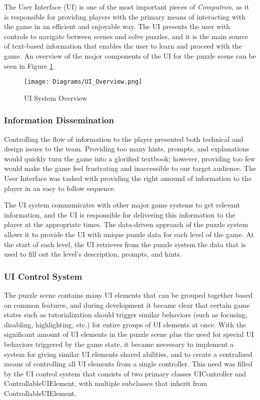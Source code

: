 The User Interface (UI) is one of the most important pieces of \textit{Computron}, as it is responsible for providing players with the primary means of interacting with the game in an efficient and enjoyable way.
The UI presents the user with controls to navigate between scenes and solve puzzles, and it is the main source of text-based information that enables the user to learn and proceed with the game.
An overview of the major components of the UI for the puzzle scene can be seen in Figure \ref{fig:ui_sytem_diagram}.\\


\begin{figure}[!hb]
    \caption{UI System Overview}
    \label{fig:ui_sytem_diagram}
    \centering
    \texttt{[image: Diagrams/UI\_Overview.png]}
\end{figure}


\subsubsection{Information Dissemination}
Controlling the flow of information to the player presented both technical and design
issues to the team. Providing too many hints, prompts, and explanations would quickly
turn the game into a glorified textbook; however, providing too few would make the game
feel frustrating and inaccessible to our target audience. The User Interface was tasked
with providing the right amound of information to the player in an easy to follow sequence.


The UI system communicates with other major game systems to get relevant information, and the UI is responsible for delivering this information to the player at the appropriate times. The data-driven approach of the puzzle system allows it to provide the UI with unique puzzle data for each level of the game. At the start of each level, the UI retrieves from the puzzle system the data that is used to fill out the level's description, prompts, and hints.


\subsubsection{UI Control System}
The puzzle scene contains many UI elements that can be grouped together based on common features, and during development it became clear that certain game states such as tutorialization should trigger similar behaviors (such as focusing, disabling, highlighting, etc.) for entire groups of UI elements at once.
With the significant amount of UI elements in the puzzle scene plus the need for special UI behaviors triggered by the game state, it became necessary to implement a system for giving similar UI elements shared abilities, and to create a centralized means of controlling all UI elements from a single controller.
This need was filled by the UI control system that consists of two primary classes UIController and ControllableUIElement, with multiple subclasses that inherit from ControllableUIElement.


